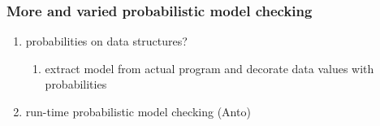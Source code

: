 \subsubsection{More and varied probabilistic model checking}
     \begin{enumerate}
      \item probabilities on data structures?
        \begin{enumerate}
         \item extract model from actual program and decorate data
               values with probabilities
        \end{enumerate}
      \item run-time probabilistic model checking (Anto)
     \end{enumerate}
